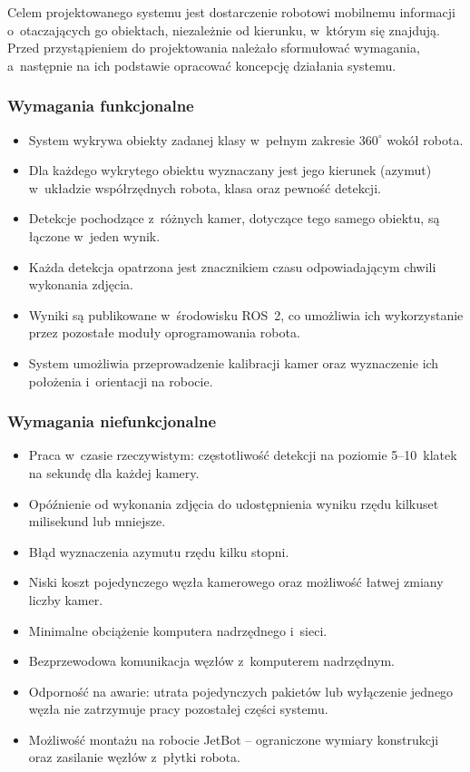Celem projektowanego systemu jest dostarczenie robotowi mobilnemu
informacji o~otaczających go obiektach, niezależnie od kierunku,
w~którym się znajdują. Przed przystąpieniem do projektowania należało
sformułować wymagania, a~następnie na ich podstawie opracować koncepcję
działania systemu.

\subsubsection*{Wymagania funkcjonalne}

\begin{itemize}[nosep]
  \item System wykrywa obiekty zadanej klasy w~pełnym zakresie
        $360^\circ$ wokół robota.
  \item Dla każdego wykrytego obiektu wyznaczany jest jego kierunek
        (azymut) w~układzie współrzędnych robota, klasa oraz pewność
        detekcji.
  \item Detekcje pochodzące z~różnych kamer, dotyczące tego samego
        obiektu, są łączone w~jeden wynik.
  \item Każda detekcja opatrzona jest znacznikiem czasu odpowiadającym
        chwili wykonania zdjęcia.
  \item Wyniki są publikowane w~środowisku ROS~2, co umożliwia ich
        wykorzystanie przez pozostałe moduły oprogramowania robota.
  \item System umożliwia przeprowadzenie kalibracji kamer oraz
        wyznaczenie ich położenia i~orientacji na robocie.
\end{itemize}

\subsubsection*{Wymagania niefunkcjonalne}

\begin{itemize}[nosep]
  \item Praca w~czasie rzeczywistym: częstotliwość detekcji na poziomie
        5--10~klatek na sekundę dla każdej kamery.
  \item Opóźnienie od wykonania zdjęcia do udostępnienia wyniku rzędu
        kilkuset milisekund lub mniejsze.
  \item Błąd wyznaczenia azymutu rzędu kilku stopni.
  \item Niski koszt pojedynczego węzła kamerowego oraz możliwość łatwej
        zmiany liczby kamer.
  \item Minimalne obciążenie komputera nadrzędnego i~sieci.
  \item Bezprzewodowa komunikacja węzłów z~komputerem nadrzędnym.
  \item Odporność na awarie: utrata pojedynczych pakietów lub wyłączenie
        jednego węzła nie zatrzymuje pracy pozostałej części systemu.
  \item Możliwość montażu na robocie JetBot -- ograniczone wymiary
        konstrukcji oraz zasilanie węzłów z~płytki robota.
\end{itemize}

